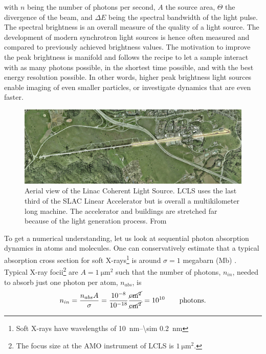with $n$ being the number of photons per second, $A$ the source area, $\Theta$ the divergence of the beam, and $\Delta\! E$ being the spectral bandwidth of the light pulse. The spectral brightness is an overall measure of the quality of a light source. The development of modern synchrotron light sources is hence often measured and compared to previously achieved brightness values. The motivation to improve the peak brightness is manifold and follows the recipe to let a sample interact with as many photons possible, in the shortest time possible, and with the best energy resolution possible. In other words, higher peak brightness light sources enable imaging of even smaller particles, or investigate dynamics that are even faster.\\[1\baselineskip]
\begin{figure}[t]
	\centering
		\includegraphics[width=1.00\textwidth]{images/aerial-view-lcls.jpg}
	\caption[Aerial view of the Linac Coherent Light Source.]{Aerial view of the Linac Coherent Light Source. LCLS uses the last third of the SLAC Linear Accelerator but is overall a multikilometer long machine. The accelerator and buildings are stretched far because of the light generation process. From \citep{SLAC-2009-Flickr}}
	\label{fig:aerial-view-lcls}
\end{figure}
To get a numerical understanding, let us look at sequential photon absorption dynamics in atoms and molecules. One can conservatively estimate that a typical absorption cross section for soft X-rays\footnote{Soft X-rays have wavelengths of \SIrange{10}{\sim 0.2}{\nano\meter}} is around $\sigma = 1$ megabarn (Mb) \citep{Bucksbaum-2011-Book}. Typical X-ray focii\footnote{The focus size at the AMO instrument of LCLS is $\SI{1}{\micro\meter\squared}$.} are $A = \SI{1}{\micro\meter\squared}$ such that the number of photons, $n_{in}$, needed to absorb just one photon per atom, $n_{abs}$, is
\begin{equation}
n_{in} = \frac{n_{abs} A}{\sigma} = \frac{10^{-8}}{10^{-18}}\si[per-mode = fraction]{\cancel\square\centi\meter\per\cancel\square\centi\meter}=10^{10}\qquad \mathrm{photons.}
\label{eq:absorption-cross-section}
\end{equation}

